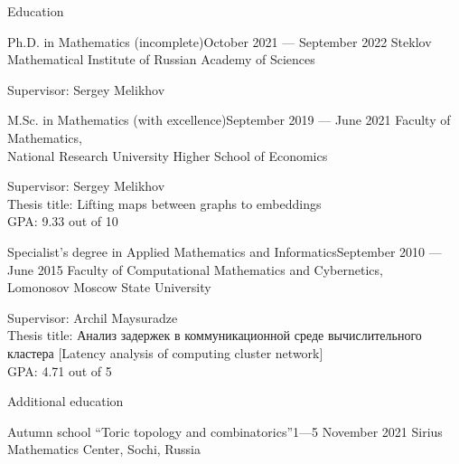 \documentclass{resume}
\begin{document}
\begin{rSection}{Education}
\begin{rSubsection}{Ph.D. in Mathematics (incomplete)}{October 2021 --- September 2022}{}
  Steklov Mathematical Institute of Russian Academy of Sciences\vspace{0.5em}

  Supervisor: Sergey Melikhov
\end{rSubsection}

\begin{rSubsection}{M.Sc. in Mathematics (with excellence)}{September 2019 --- June 2021}{}
  Faculty of Mathematics, \\
  National Research University Higher School of Economics \vspace{0.5em}

  Supervisor: Sergey Melikhov \\
  Thesis title: Lifting maps between graphs to embeddings \\
  GPA: 9.33 out of 10
\end{rSubsection}

\begin{rSubsection}{Specialist's degree in Applied Mathematics and Informatics}{September 2010 --- June 2015}{}
  Faculty of Computational Mathematics and Cybernetics, \\
  Lomonosov Moscow State University \vspace{0.5em}

  Supervisor: Archil Maysuradze \\
  Thesis title: Анализ задержек в коммуникационной среде вычислительного кластера [Latency analysis of computing cluster network] \\
  GPA: 4.71 out of 5
\end{rSubsection}
\end{rSection}

\begin{rSection}{Additional education}
  \begin{rSubsection}{Autumn school ``Toric topology and combinatorics''}{1---5 November 2021}{}
    Sirius Mathematics Center, Sochi, Russia
  \end{rSubsection}
\end{rSection}
\pagebreak
\end{document}
